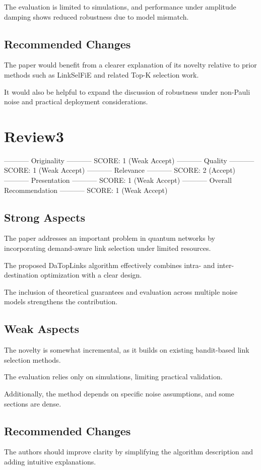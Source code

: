 \documentclass[conference,15pt]{IEEEtran}
\begin{document}
The evaluation is limited to simulations, and performance under
amplitude damping shows reduced robustness due to model mismatch.


\subsection*{Recommended Changes}
\label{sec:org05445b9}
The paper would benefit from a clearer explanation of its novelty
relative to prior methods such as LinkSelFiE and related Top-K
selection work.


It would also be helpful to expand the discussion of robustness under
non-Pauli noise and practical deployment considerations.


\section*{Review3}
\label{sec:orgcfe6816}
----------- Originality -----------
SCORE: 1 (Weak Accept)
----------- Quality -----------
SCORE: 1 (Weak Accept)
----------- Relevance -----------
SCORE: 2 (Accept)
----------- Presentation -----------
SCORE: 1 (Weak Accept)
----------- Overall Recommendation -----------
SCORE: 1 (Weak Accept)

\subsection*{Strong Aspects}
\label{sec:org90ce94b}
The paper addresses an important problem in quantum networks by
incorporating demand-aware link selection under limited resources.

The proposed DaTopLinks algorithm effectively combines intra- and
inter-destination optimization with a clear design.

The inclusion of theoretical guarantees and evaluation across multiple
noise models strengthens the contribution.


\subsection*{Weak Aspects}
\label{sec:org78e07a1}
The novelty is somewhat incremental, as it builds on existing
bandit-based link selection methods.

The evaluation relies only on simulations, limiting practical
validation.

Additionally, the method depends on specific noise assumptions, and
some sections are dense.

\subsection*{Recommended Changes}
\label{sec:org391b95f}
The authors should improve clarity by simplifying the algorithm
description and adding intuitive explanations.
\end{document}
